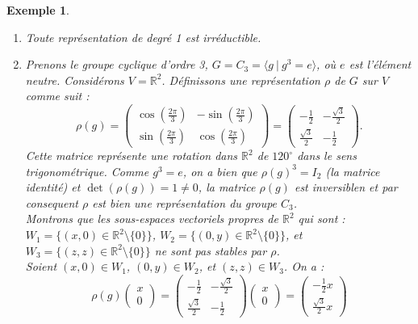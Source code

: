\documentclass[a4paper, 14pt]{report}
\newtheorem{example}{Exemple}[section]
\begin{document}
\begin{onehalfspace}
{			\begin{example} 
				\begin{enumerate} \
					\item Toute représentation de degré 1 est irréductible.
					\item Prenons le groupe cyclique d'ordre 3, \( G = C_3 = \langle g \ | \ g^3 = e \rangle \), où \( e \) est l'élément neutre.
					Considérons \( V = \mathbb{R}^2 \). Définissons une représentation \( \rho \) de \( G \) sur \( V \) comme suit :
					\[
					\rho(g) =
					\begin{pmatrix}
						\cos\left(\frac{2\pi}{3}\right) & -\sin\left(\frac{2\pi}{3}\right) \\
						\sin\left(\frac{2\pi}{3}\right) & \cos\left(\frac{2\pi}{3}\right)
					\end{pmatrix}
					=
					\begin{pmatrix}
						-\frac{1}{2} & -\frac{\sqrt{3}}{2} \\
						\frac{\sqrt{3}}{2} & -\frac{1}{2}
					\end{pmatrix}.
					\]
					Cette matrice représente une rotation dans \( \mathbb{R}^2 \) de \( 120^\circ \) dans le sens trigonométrique. Comme \( g^3 = e \), on a bien que \( \rho(g)^3 = I_2 \) (la matrice identité) et \(\det(\rho(g))=1 \neq 0\), la matrice \(\rho(g)\) est inversiblen et par consequent \( \rho \) est bien une représentation du groupe \( C_3 \).\\
					Montrons que les sous-espaces vectoriels propres de \( \mathbb{R}^2 \) qui sont : 
					\( W_1 = \{ (x, 0) \in \mathbb{R}^2 \setminus \{0\} \} \), 
					\( W_2 = \{ (0, y) \in \mathbb{R}^2 \setminus \{0\} \} \), 
					et 
					\( W_3 = \{ (z, z) \in \mathbb{R}^2 \setminus \{0\} \} \) 
					ne sont pas stables par \( \rho \).\\
					Soient \( (x, 0) \in W_1 \), \( (0, y) \in W_2 \), et \( (z, z) \in W_3 \). On a :
					\[
					\rho(g) \begin{pmatrix} x \\ 0 \end{pmatrix} = 
					\begin{pmatrix} -\frac{1}{2} & -\frac{\sqrt{3}}{2} \\ \frac{\sqrt{3}}{2} & -\frac{1}{2} \end{pmatrix} 
					\begin{pmatrix} x \\ 0 \end{pmatrix} = 
					\begin{pmatrix} -\frac{1}{2}x \\ \frac{\sqrt{3}}{2}x \end{pmatrix}
\]
\end{enumerate}
\end{example}}
\end{onehalfspace}
\end{document}
